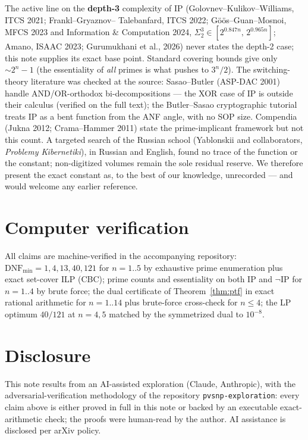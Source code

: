 \documentclass[11pt]{article}
\newcommand{\IP}{\mathrm{IP}}
\newcommand{\DNFmin}{\mathrm{DNF}_{\min}}
\begin{document}
The active line on the \textbf{depth-3} complexity of $\IP$
(Golovnev--Kulikov--Williams, ITCS 2021; Frankl--Gryaznov--%
Talebanfard, ITCS 2022; G\"o\"os--Guan--Mosnoi, MFCS 2023 and
Information \& Computation 2024,
$\Sigma_2^3 \in [2^{0.847n},\, 2^{0.965n}]$; Amano, ISAAC 2023;
Gurumukhani et al., 2026) never states the depth-2 case; this note
supplies its exact base point. Standard covering bounds give only
$\sim 2^n - 1$ (the essentiality of \emph{all} primes is what pushes
to $3^n/2$). The switching-theory literature was checked at the
source: Sasao--Butler (ASP-DAC 2001) handle AND/OR-orthodox
bi-decompositions --- the XOR case of $\IP$ is outside their calculus
(verified on the full text); the Butler--Sasao cryptographic tutorial
treats $\IP$ as a bent function from the ANF angle, with no SOP size.
Compendia (Jukna 2012; Crama--Hammer 2011) state the prime-implicant
framework but not this count. A targeted search of the Russian school
(Yablonskii and collaborators, \emph{Problemy Kibernetiki}), in
Russian and English, found no trace of the function or the constant;
non-digitized volumes remain the sole residual reserve. We therefore
present the exact constant as, to the best of our knowledge,
unrecorded --- and would welcome any earlier reference.

\section{Computer verification}

All claims are machine-verified in the accompanying repository:
$\DNFmin = 1, 4, 13, 40, 121$ for $n = 1..5$ by exhaustive prime
enumeration plus exact set-cover ILP (CBC); prime counts and
essentiality on both $\IP$ and $\lnot\IP$ for $n = 1..4$ by brute
force; the dual certificate of Theorem~\ref{thm:ptf} in exact
rational arithmetic for $n = 1..14$ plus brute-force cross-check for
$n \le 4$; the LP optimum $40/121$ at $n = 4, 5$ matched by the
symmetrized dual to $10^{-8}$.

\section{Disclosure}

This note results from an AI-assisted exploration (Claude,
Anthropic), with the adversarial-verification methodology of the
repository \texttt{pvsnp-exploration}: every claim above is either
proved in full in this note or backed by an executable
exact-arithmetic check; the proofs were human-read by the author. AI
assistance is disclosed per arXiv policy.
\end{document}
